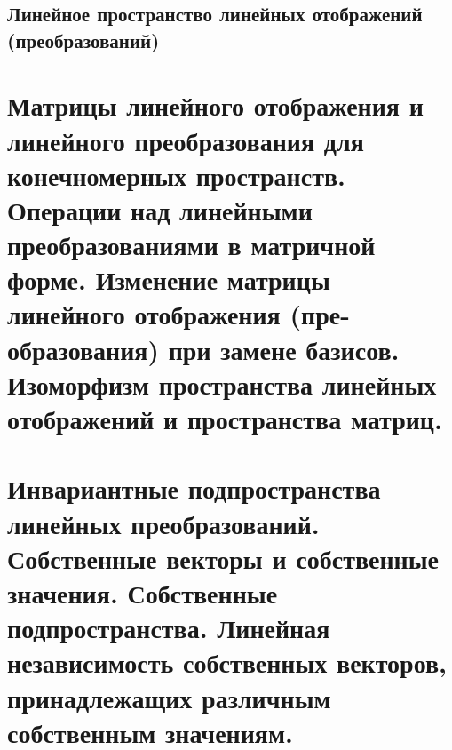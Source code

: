 \documentclass[11pt; a4paper]{report}
\theoremstyle{plain} %
\theoremstyle{defenition}
\theoremstyle{remark}
\begin{document}
\subsection{Линейное пространство линейных отображений (преобразований)}


\newpage
\section{Матрицы линейного отображения и линейного преобразования для конечномерных пространств. Операции над линейными преобразованиями в матричной форме. Изменение матрицы линейного отображения (пре- образования) при замене базисов. Изоморфизм пространства линейных отображений и пространства матриц.}


\newpage
\section{Инвариантные подпространства линейных преобразований. Собственные векторы и собственные значения. Собственные подпространства. Линейная независимость собственных векторов, принадлежащих различным собственным значениям.}
\end{document}
